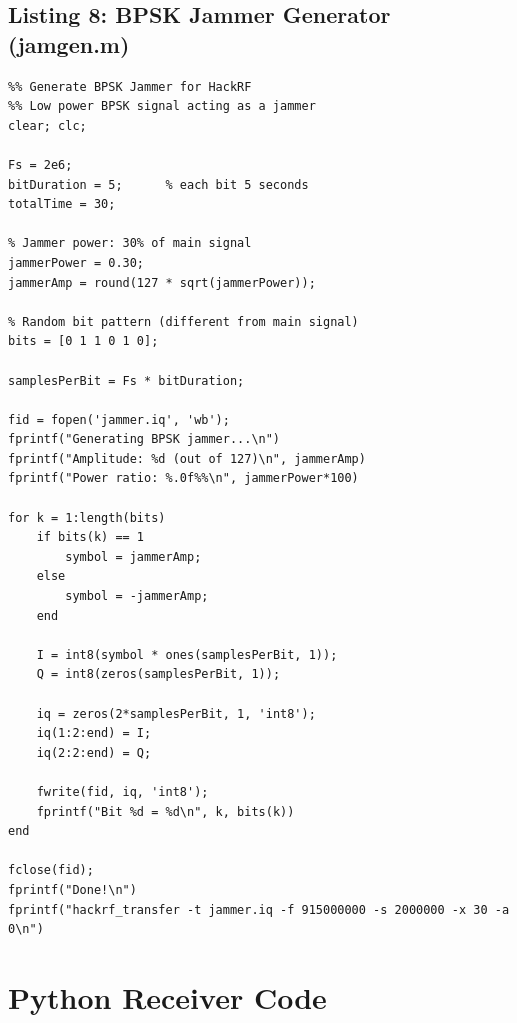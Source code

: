 \documentclass{article}
\begin{document}
\subsection{Listing 8: BPSK Jammer Generator (jamgen.m)}\label{lst:bpskjamgen}
\begin{verbatim}
%% Generate BPSK Jammer for HackRF
%% Low power BPSK signal acting as a jammer
clear; clc;

Fs = 2e6;
bitDuration = 5;      % each bit 5 seconds
totalTime = 30;

% Jammer power: 30% of main signal
jammerPower = 0.30;
jammerAmp = round(127 * sqrt(jammerPower));

% Random bit pattern (different from main signal)
bits = [0 1 1 0 1 0];

samplesPerBit = Fs * bitDuration;

fid = fopen('jammer.iq', 'wb');
fprintf("Generating BPSK jammer...\n")
fprintf("Amplitude: %d (out of 127)\n", jammerAmp)
fprintf("Power ratio: %.0f%%\n", jammerPower*100)

for k = 1:length(bits)
    if bits(k) == 1
        symbol = jammerAmp;
    else
        symbol = -jammerAmp;
    end

    I = int8(symbol * ones(samplesPerBit, 1));
    Q = int8(zeros(samplesPerBit, 1));

    iq = zeros(2*samplesPerBit, 1, 'int8');
    iq(1:2:end) = I;
    iq(2:2:end) = Q;

    fwrite(fid, iq, 'int8');
    fprintf("Bit %d = %d\n", k, bits(k))
end

fclose(fid);
fprintf("Done!\n")
fprintf("hackrf_transfer -t jammer.iq -f 915000000 -s 2000000 -x 30 -a 0\n")
\end{verbatim}

\section{Python Receiver Code}\label{app:python}
\end{document}
